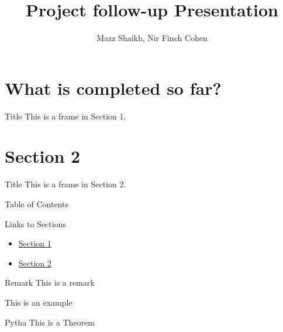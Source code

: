 \documentclass{beamer}
\title{Project follow-up Presentation}
\date{}
\author{Mazz Shaikh, Nir Finch Cohen}
\institute{Designing Oscillator for an Antenna at \(\sim\)3.5 GHz}
\begin{document}
\maketitle

\section{What is completed so far?}
\label{sec:section1}

\begin{frame}{Title}
This is a frame in Section 1.
\end{frame}

\section{Section 2}
\label{sec:section2}

\begin{frame}{Title}
This is a frame in Section 2.
\end{frame}


\begin{frame}{Table of Contents}
\tableofcontents
\end{frame}

\begin{frame}{Links to Sections}
\begin{itemize}
    \item \hyperlink{sec:section1}{Section 1}
    \item \hyperlink{sec:section2}{Section 2}
\end{itemize}
\end{frame}

\begin{frame}
  \begin{block}{Remark}
    This is a remark
  \end{block}

  \begin{example}
    This is an example
  \end{example}
  
  \begin{theorem}{Pytha}
    This is a Theorem
  \end{theorem}

\end{frame}
\end{document}
